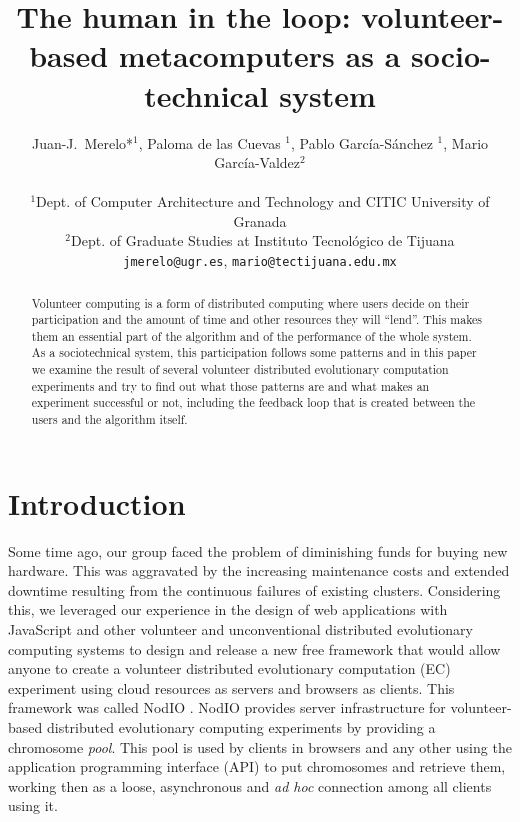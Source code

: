 \documentclass[letterpaper]{article}
\title{The human in the loop: volunteer-based metacomputers as a socio-technical
  system}
\author{Juan-J.~Merelo*$^1$, Paloma de las Cuevas $^1$, Pablo
  Garc\'ia-S\'anchez $^1$, Mario Garc\'ia-Valdez$^2$\\
\mbox{}\\
$^1$Dept. of Computer Architecture and Technology and CITIC University of Granada \\
$^2$Dept. of Graduate Studies at Instituto Tecnol\'ogico de Tijuana \\
{\tt jmerelo@ugr.es}, {\tt mario@tectijuana.edu.mx}}
\begin{document}
\maketitle

\begin{abstract}
Volunteer computing is a form of distributed computing where users
decide on their participation and the amount of time and other
resources they will ``lend''. This makes them an essential part of the
algorithm and of the performance of the whole system. As a
sociotechnical system, this participation follows some patterns and in
this paper we examine the result of several volunteer distributed
evolutionary computation experiments and try to find out what
those patterns are and what makes an experiment successful or not,
including the feedback loop that is created between the users and the
algorithm itself.
\end{abstract}

\section{Introduction}
\label{introduction}

Some time ago, our group faced the problem of diminishing funds for
buying new hardware. This was aggravated by the increasing maintenance
costs and extended downtime resulting from the continuous failures of
existing clusters.  Considering this, we leveraged our experience in
the design of web applications with JavaScript and other volunteer and
unconventional distributed evolutionary computing systems to design
and release a new free framework that would allow anyone to create a
volunteer distributed evolutionary computation (EC) experiment using
cloud resources as servers and browsers as clients. This framework was
called NodIO \citep{2016arXiv160101607M}. NodIO provides server
infrastructure for volunteer-based distributed evolutionary computing
experiments by providing a chromosome {\em pool}. This pool is used by
clients in browsers and any other using the application programming
interface (API) to put chromosomes and retrieve them, working then as
a loose, asynchronous and {\em ad hoc} connection among all clients
using it. 
\end{document}

